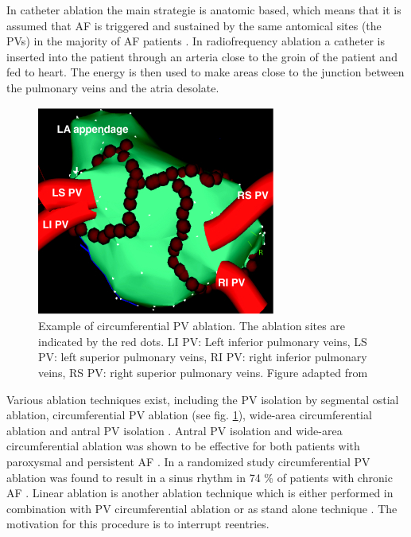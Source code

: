 \documentclass[type=dr, dr=rernat, accentcolor=tud7b,colorbacktitle, bigchapter, openright, twoside, 12pt ]{tudthesis}
\begin{document}
In catheter ablation the main strategie is anatomic based, which means that it is assumed that AF is triggered and sustained by the same 
antomical sites (the PVs) in the majority of AF patients \cite{CE09}. In radiofrequency ablation a catheter is inserted into the patient 
through an arteria close to the groin of the patient and fed to heart. The energy is then used to make areas close to the junction between 
the pulmonary veins and the atria desolate.\newline

\begin{figure}[H]
\begin{center}
\includegraphics[scale=1.0]{ablation_cut.png}
\caption{Example of circumferential PV ablation. The ablation sites are indicated by the red dots. LI PV: Left inferior pulmonary veins, 
LS PV: left superior pulmonary veins, RI PV: right inferior pulmonary veins, RS PV: right superior pulmonary veins. Figure adapted 
from \cite{Ora06}}
\label{af_circ}
\end{center}
\end{figure}

Various ablation techniques exist, including the PV isolation by segmental ostial ablation, circumferential PV ablation (see 
fig. \ref{af_circ}), wide-area circumferential ablation and antral PV isolation \cite{Ora06} \cite{Ora03} \cite{Ouy04}. Antral PV isolation 
and wide-area circumferential ablation was shown to be effective for both patients with paroxysmal and persistent AF \cite{CE09} \cite{Ora03}. 
In a randomized study circumferential PV ablation was found to result in a sinus rhythm in 74 \% of patients with chronic AF \cite{Ora06}. 
Linear ablation is another ablation technique which is either performed in combination with PV circumferential ablation or as stand alone 
technique \cite{CE09}. The motivation for this procedure is to interrupt reentries.
\end{document}
